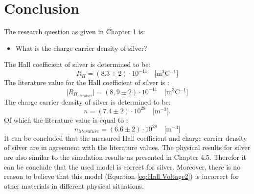 \chapter{Conclusion}
The research question as given in Chapter 1 is:
 \begin{itemize}
     \item  What is the charge carrier density of silver?
 \end{itemize}
The Hall coefficient of silver is determined to be:
    \begin{equation}
        R_H = (8.3 \pm 2) \cdot 10^{-11} \quad \text{[m$^3$C$^{-1}$]}
    \end{equation}
The literature value for the Hall coefficient of silver is \cite{apparatus_silver}:
    \begin{equation}
        \mid R_{H}_{ literature} \mid = (8,9 \pm 2) \cdot 10^{-11}  \quad \text{[m$^3$C$^{-1}$]}
    \end{equation}
The charge carrier density of silver is determined to be:
    \begin{equation}
        n = (7.4 \pm 2)\cdot 10^{28} \quad \text{[m$^{-3}$]}.
    \end{equation}
Of which the literature value is equal to \cite{apparatus_silver}:
    \begin{equation}
        n_{literature} = (6.6 \pm 2)\cdot 10^{28} \quad \text{[m$^{-3}$]}
    \end{equation}
It can be concluded that the measured Hall coefficient and charge carrier density of silver are in agreement with the literature values. The physical results for silver are also similar to the simulation results as presented in Chapter 4.5. Therefor it can be conclude that the used model is correct for silver. Moreover, there is no reason to believe that this model (Equation \ref{eq:Hall Voltage2}) is incorrect for other materials in different physical situations.